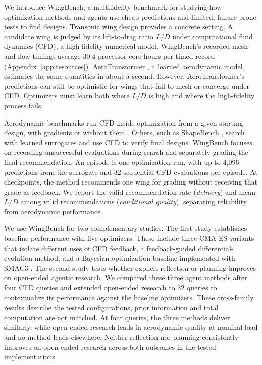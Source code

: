 \documentclass{article} %
\newcommand{\AvgCoreHoursPerEvalOverall}{30.4}
\begin{document}
We introduce WingBench, a multifidelity benchmark for studying how optimization methods and agents use cheap predictions and limited, failure-prone tests to find designs. Transonic wing design provides a concrete setting. A
candidate wing is judged by its lift-to-drag ratio $L/D$ under computational
fluid dynamics (CFD), a
high-fidelity numerical model. WingBench's recorded mesh and flow timings
average \AvgCoreHoursPerEvalOverall{} processor-core hours per timed record
(Appendix~\ref{app:resources}). AeroTransformer
\citep{yang2026aerotransformer}, a learned aerodynamic model, estimates the same
quantities in about a second. However, AeroTransformer's predictions can still be optimistic for wings
that fail to mesh or converge under CFD. Optimizers must learn both where
$L/D$ is high and where the high-fidelity process fails.

Aerodynamic benchmarks run CFD inside optimization from a given
starting design, with gradients \citep{lyu2015crm,felten2025engibench} or without
them \citep{plaban2026derivativefree}. Others, such as
ShapeBench \citep{fazliani2026shapebench}, search with learned surrogates and
use CFD to verify final designs. WingBench focuses on recording unsuccessful
evaluations during search and separately grading the final recommendation.
An episode is one optimization run, with up to
4{,}096 predictions from the surrogate and 32 sequential CFD evaluations per
episode. At checkpoints, the method recommends one wing for grading without
receiving that grade as feedback. We report the valid-recommendation rate
(\emph{delivery}) and mean $L/D$ among valid recommendations
(\emph{conditional quality}), separating reliability from aerodynamic performance.

We use WingBench for two complementary studies. The first study establishes baseline
performance with five optimizers. These include three CMA-ES variants that
isolate different uses of CFD feedback, a feedback-guided differential-evolution
method, and a Bayesian optimization baseline implemented with SMAC3
\citep{lindauer2022smac3}. The second study tests whether explicit reflection or planning
improves on open-ended agentic research. We compared these three agent methods after four CFD queries and extended open-ended research to
32 queries to contextualize its performance against the baseline optimizers.
These cross-family results describe the tested configurations; prior information
and total computation are not matched. At four queries, the three methods deliver similarly, while open-ended research
leads in aerodynamic quality at nominal load and no method leads elsewhere. Neither
reflection nor planning consistently improves on open-ended research across
both outcomes in the tested implementations.
\end{document}
